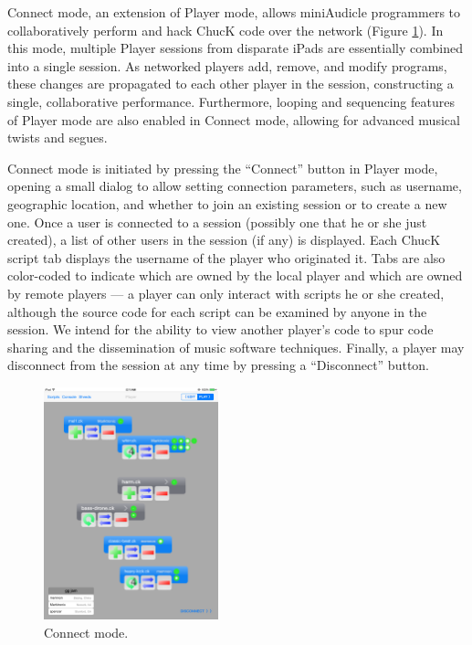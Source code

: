 \documentclass{article}
\begin{document}
Connect mode, an extension of Player mode, allows miniAudicle programmers to collaboratively perform and hack ChucK code over the network (Figure \ref{fig:connect}). 
In this mode, multiple Player sessions from disparate iPads are essentially combined into a single session. 
As networked players add, remove, and modify programs, these changes are propagated to each other player in the session, constructing a single, collaborative performance. 
Furthermore, looping and sequencing features of Player mode are also enabled in Connect mode, allowing for advanced musical twists and segues. 

Connect mode is initiated by pressing the ``Connect'' button in Player mode, opening a small dialog to allow setting connection parameters, such as username, geographic location, and whether to join an existing session or to create a new one. 
Once a user is connected to a session (possibly one that he or she just created), a list of other users in the session (if any) is displayed. 
Each ChucK script tab displays the username of the player who originated it. 
Tabs are also color-coded to indicate which are owned by the local player and which are owned by remote players --- a player can only interact with scripts he or she created, although the source code for each script can be examined by anyone in the session. 
We intend for the ability to view another player's code to spur code sharing and the dissemination of music software techniques. 
Finally, a player may disconnect from the session at any time by pressing a ``Disconnect'' button. 

\begin{figure}[hb]
	\centering
		\includegraphics[width=0.45\textwidth]{figures/connect.png}
	\caption{Connect mode. }
	\label{fig:connect}
\end{figure}
\end{document}
